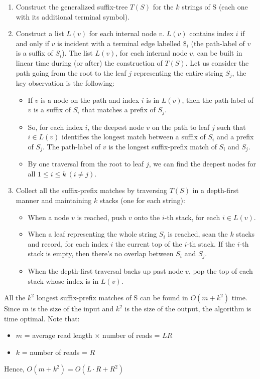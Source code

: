 \begin{enumerate}
	\item Construct the generalized suffix-tree $T(S)$ for the $k$ strings of S (each one with its additional terminal symbol).
	\item Construct a list $L(v)$ for each internal node $v$. $L(v)$ contains index $i$ if and only if $v$ is incident with a terminal edge labelled \$$_i$ (the path-label of $v$ is a suffix of $S_i$). The list $L(v)$, for each internal node $v$, can be built in linear time during (or after) the construction of $T(S)$. Let us consider the path going from the root to the leaf $j$ representing the entire string $S_j$, the key observation is the following:
	\begin{itemize}
		\item If $v$ is a node on the path and index $i$ is in $L(v)$, then the path-label of $v$ is a suffix of $S_i$ that matches a prefix of $S_j$.
		\item So, for each index $i$, the deepest node $v$ on the path to leaf $j$ such that $i \in L(v)$ identifies the longest match between a suffix of $S_i$ and a prefix of $S_j$. The path-label of $v$ is the longest suffix-prefix match of $S_i$ and $S_j$.
		\item By one traversal from the root to leaf $j$, we can find the deepest nodes for all $1 \leq i \leq k~(i \neq j)$.
	\end{itemize}
	\item Collect all the suffix-prefix matches by traversing $T(S)$ in a depth-first manner and maintaining $k$ stacks (one for each string):
	\begin{itemize}
		\item When a node $v$ is reached, push $v$ onto the $i$-th stack, for each $i \in L(v)$.
		\item When a leaf representing the whole string $S_i$ is reached, scan the $k$ stacks and record, for each index $i$ the current top of the $i$-th stack. If the $i$-th stack is empty, then there's no overlap between $S_i$ and $S_j$.
		\item When the depth-first traversal backs up past node $v$, pop the top of each stack whose index is in $L(v)$.
	\end{itemize}
\end{enumerate}
All the $k^2$ longest suffix-prefix matches of S can be found in $O(m+k^2)$ time. Since $m$ is the size of the input and $k^2$ is the size of the output, the algorithm is time optimal. Note that:
\begin{itemize}
	\item $m$ = average read length $\times$ number of reads = $LR$
	\item $k$ = number of reads = $R$
\end{itemize}
Hence, $O(m+k^2) = O(L \cdot R + R^2)$ 

